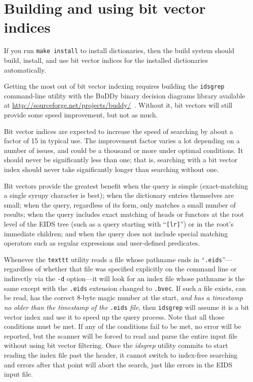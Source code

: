 \documentclass[twocolumn]{report}
\begin{document}

\section{Building and using bit vector indices}

If you run \texttt{make install} to install dictionaries, then the build
system should build, install, and use bit vector indices for the installed
dictionaries automatically.

Getting the most out of bit vector indexing requires building the
\texttt{idsgrep} command-line utility with the BuDDy binary decision
diagrams library available at
\url{http://sourceforge.net/projects/buddy/}~\cite{BuDDy}.  Without it, bit
vectors will still provide some speed improvement, but not as much.

Bit vector indices are expected to increase the speed of searching by about
a factor of 15 in typical use.  The improvement factor varies a lot
depending on a number of issues, and could be a thousand or more under
optimal conditions.  It should never be significantly less than one; that
is, searching with a bit vector index should never take significantly longer
than searching without one.

Bit vectors provide the greatest benefit when the query is simple
(exact-matching a single syrupy character is best); when the dictionary
entries themselves are small; when the query, regardless of its form, only
matches a small number of results; when the query includes exact matching of
heads or functors at the root level of the EIDS tree (such as a query
starting with ``\texttt{[lr]}'') or in the root's immediate children; and
when the query does not include special matching operators such as regular
expressions and user-defined predicates.

Whenever the \texttt{texttt} utility reads a file whose pathname ends in
``\texttt{.eids}''---regardless of whether that file was specified
explicitly on the command line or indirectly via the \texttt{-d} option---it
will look for an index file whose pathname is the same except with the
\texttt{.eids} extension changed to \texttt{.bvec}.  If such a file exists,
can be read, has the correct 8-byte magic number at the start, \emph{and has
a timestamp no older than the timestamp of the} \texttt{.eids} \emph{file},
then \texttt{idsgrep} will assume it is a bit vector index and use it to
speed up the query process.  Note that all those conditions must be met.  If
any of the conditions fail to be met, no error will be reported, but the
scanner will be forced to read and parse the entire input file without using
bit vector filtering.  Once the \emph{idsgrep} utility commits to start
reading the index file past the header, it cannot switch to index-free
searching and errors after that point will abort the search, just like
errors in the EIDS input file.
\end{document}
